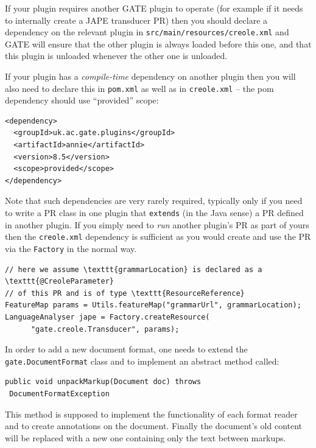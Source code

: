 If your plugin requires another GATE plugin to operate (for
example if it needs to internally create a JAPE transducer PR) then you
should declare a dependency on the relevant plugin in
\texttt{src/main/resources/creole.xml} and GATE will ensure that the other
plugin is always loaded before this one, and that this plugin is unloaded
whenever the other one is unloaded.

If your plugin has a \emph{compile-time} dependency on another plugin then you
will also need to declare this in \texttt{pom.xml} as well as in
\texttt{creole.xml} -- the pom dependency should use ``provided'' scope:
\begin{verbatim}
<dependency>
  <groupId>uk.ac.gate.plugins</groupId>
  <artifactId>annie</artifactId>
  <version>8.5</version>
  <scope>provided</scope>
</dependency>
\end{verbatim}
%
Note that such dependencies are very rarely required, typically only if you
need to write a PR class in one plugin that \texttt{extends} (in the Java
sense) a PR defined in another plugin.  If you simply need to \emph{run}
another plugin's PR as part of yours then the \texttt{creole.xml} dependency is
sufficient as you would create and use the PR via the \texttt{Factory} in the
normal way.
\begin{lstlisting}
// here we assume \texttt{grammarLocation} is declared as a \texttt{@CreoleParameter}
// of this PR and is of type \texttt{ResourceReference}
FeatureMap params = Utils.featureMap("grammarUrl", grammarLocation);
LanguageAnalyser jape = Factory.createResource(
      "gate.creole.Transducer", params);
\end{lstlisting}


In order to add a new document format, one needs to
extend the {\tt gate.DocumentFormat} class and to implement an
abstract method called:

\begin{lstlisting}
public void unpackMarkup(Document doc) throws
 DocumentFormatException
\end{lstlisting} 
 
This method is supposed to implement the functionality of each format
reader and to create annotations on the document. Finally the
document's old content will be replaced with a new one containing only
the text between markups.


